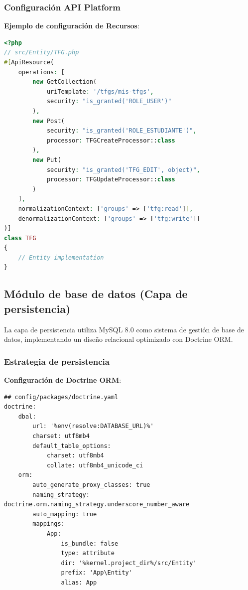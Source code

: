 \documentclass[12pt,a4paper,oneside]{report}
\begin{document}
\subsubsection{Configuración API
Platform}\label{configuraciuxf3n-api-platform}

\textbf{Ejemplo de configuración de Recursos}:

\begin{lstlisting}[language=PHP]
<?php
// src/Entity/TFG.php
#[ApiResource(
    operations: [
        new GetCollection(
            uriTemplate: '/tfgs/mis-tfgs',
            security: "is_granted('ROLE_USER')"
        ),
        new Post(
            security: "is_granted('ROLE_ESTUDIANTE')",
            processor: TFGCreateProcessor::class
        ),
        new Put(
            security: "is_granted('TFG_EDIT', object)",
            processor: TFGUpdateProcessor::class
        )
    ],
    normalizationContext: ['groups' => ['tfg:read']],
    denormalizationContext: ['groups' => ['tfg:write']]
)]
class TFG
{
    // Entity implementation
}
\end{lstlisting}

\subsection{Módulo de base de datos (Capa de
persistencia)}\label{muxf3dulo-de-base-de-datos-capa-de-persistencia}

La capa de persistencia utiliza MySQL 8.0 como sistema de gestión de
base de datos, implementando un diseño relacional optimizado con
Doctrine ORM.

\subsubsection{Estrategia de
persistencia}\label{estrategia-de-persistencia}

\textbf{Configuración de Doctrine ORM}:

\begin{lstlisting}
## config/packages/doctrine.yaml
doctrine:
    dbal:
        url: '%env(resolve:DATABASE_URL)%'
        charset: utf8mb4
        default_table_options:
            charset: utf8mb4
            collate: utf8mb4_unicode_ci
    orm:
        auto_generate_proxy_classes: true
        naming_strategy: doctrine.orm.naming_strategy.underscore_number_aware
        auto_mapping: true
        mappings:
            App:
                is_bundle: false
                type: attribute
                dir: '%kernel.project_dir%/src/Entity'
                prefix: 'App\Entity'
                alias: App
\end{lstlisting}
\end{document}
